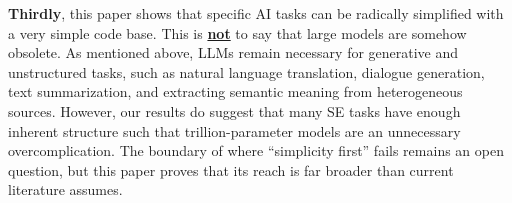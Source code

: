 \documentclass[AMA,STIX2COL]{WileyNJDv5}
\begin{document}
{\bf Thirdly}, this paper shows that    specific AI tasks can be radically simplified with a very simple code base.
This is \underline{\bf not} to say that 
 large models are somehow obsolete.  As mentioned above,
 LLMs remain   necessary for
  generative and unstructured tasks, such as natural language translation,
  dialogue generation, text summarization, and extracting semantic meaning
  from heterogeneous sources. However, our results
  do suggest that   many SE
  tasks have enough inherent structure  such that trillion-parameter models are an unnecessary 
    overcomplication. The boundary of where ``simplicity first'' fails
  remains an open question, but this paper proves that its reach is far broader
  than current literature assumes.

  
 
 
\end{document}
